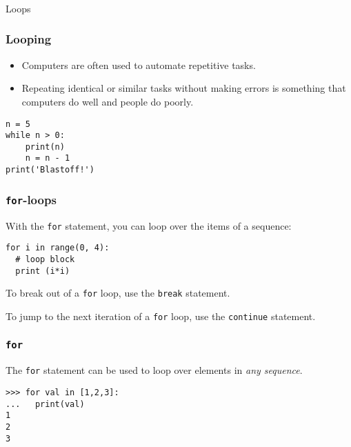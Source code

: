 \begin{frame}[fragile]\frametitle{}
\begin{center}
{\Large Loops}
\end{center}
\end{frame}


\begin{frame}[fragile]\frametitle{Looping}
\begin{itemize}
\item Computers are often used to automate repetitive tasks. 
\item  Repeating identical or similar tasks without making errors is something that computers do well and people
do poorly. 
\end{itemize}
\begin{lstlisting}
n = 5
while n > 0:
	print(n)
	n = n - 1
print('Blastoff!')
\end{lstlisting}
\end{frame}



\begin{frame}[fragile]
  \frametitle{\texttt{for}-loops}
    With the  \texttt{for} statement, you can loop over the items of
    a sequence:
\begin{lstlisting}
for i in range(0, 4):
  # loop block
  print (i*i)
\end{lstlisting}

  
  To break out of a \texttt{for} loop, use the \texttt{break}
  statement.

  
  To jump to the next iteration of a \texttt{for} loop, use the
  \texttt{continue} statement.
\end{frame}

\begin{frame}[fragile]\frametitle{\texttt{for}}
  The \texttt{for} statement can be used to loop over elements in \emph{any sequence}.


\begin{lstlisting}
>>> for val in [1,2,3]:
...   print(val)
1
2
3
\end{lstlisting}
\end{frame}

